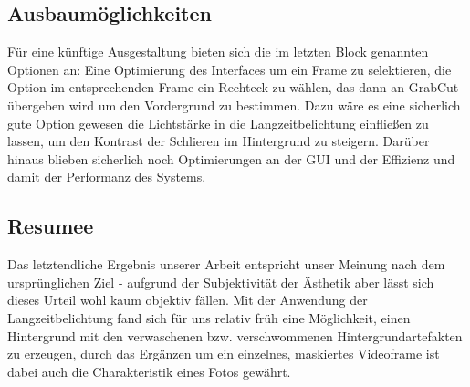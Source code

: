 \documentclass[12pt]{scrartcl}
\begin{document}
\subsection{Ausbaum\"oglichkeiten}
F\"ur eine k\"unftige Ausgestaltung bieten sich die im letzten Block genannten Optionen an: Eine Optimierung des Interfaces um ein Frame zu selektieren, die Option im entsprechenden Frame ein Rechteck zu w\"ahlen, das dann an GrabCut \"ubergeben wird um den Vordergrund zu bestimmen. Dazu w\"are es eine sicherlich gute Option gewesen die Lichtst\"arke in die Langzeitbelichtung einflie{\ss}en zu lassen, um den Kontrast der Schlieren im Hintergrund zu steigern. Darüber hinaus blieben sicherlich noch Optimierungen an der GUI und der Effizienz und damit der Performanz des Systems.
\subsection{Resumee}
Das letztendliche Ergebnis unserer Arbeit entspricht unser Meinung nach dem urspr\"unglichen Ziel - aufgrund der Subjektivit\"at der
\"Asthetik aber l\"asst sich dieses Urteil wohl kaum objektiv f\"allen. Mit der Anwendung der Langzeitbelichtung fand sich f\"ur uns relativ
fr\"uh eine M\"oglichkeit, einen Hintergrund mit den verwaschenen bzw. verschwommenen Hintergrundartefakten zu erzeugen, durch das Erg\"anzen um ein einzelnes, maskiertes Videoframe ist dabei auch die Charakteristik eines Fotos gewährt.
\end{document}
